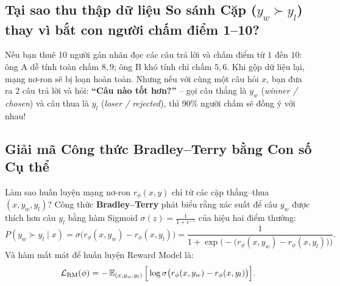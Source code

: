 \subsection{Tại sao thu thập dữ liệu So sánh Cặp ($y_w \succ y_l$) thay vì bắt con người chấm điểm 1--10?}
Nếu bạn thuê 10 người gán nhãn đọc các câu trả lời và chấm điểm từ $1$ đến $10$: ông A dễ tính toàn chấm $8, 9$; ông B khó tính chỉ chấm $5, 6$. Khi gộp dữ liệu lại, mạng nơ-ron sẽ bị loạn hoàn toàn.
Nhưng nếu với cùng một câu hỏi $x$, bạn đưa ra 2 câu trả lời và hỏi: \textbf{``Câu nào tốt hơn?''} -- gọi câu thắng là $y_w$ (\textit{winner / chosen}) và câu thua là $y_l$ (\textit{loser / rejected}), thì 90\% người chấm sẽ đồng ý với nhau!

\subsection{Giải mã Công thức Bradley--Terry \citep{bradley1952rank} bằng Con số Cụ thể}
Làm sao huấn luyện mạng nơ-ron $r_\phi(x, y)$ chỉ từ các cặp thắng--thua $(x, y_w, y_l)$? Công thức \textbf{Bradley--Terry} phát biểu rằng xác suất để câu $y_w$ được thích hơn câu $y_l$ bằng hàm Sigmoid $\sigma(z) = \frac{1}{1 + e^{-z}}$ của hiệu hai điểm thưởng:
\begin{equation}
    P(y_w \succ y_l \mid x) = \sigma\Big( r_\phi(x, y_w) - r_\phi(x, y_l) \Big) = \frac{1}{1 + \exp\Big(-\big(r_\phi(x, y_w) - r_\phi(x, y_l)\big)\Big)}.
    \label{eq:bt_prob}
\end{equation}
Và hàm mất mát để huấn luyện Reward Model là:
\begin{equation}
    \mathcal{L}_{\text{RM}}(\phi) = -\operatorname{\mathbb{E}}_{(x, y_w, y_l)} \Big[ \log \sigma\big( r_\phi(x, y_w) - r_\phi(x, y_l) \big) \Big].
    \label{eq:rm_loss_eng}
\end{equation}

